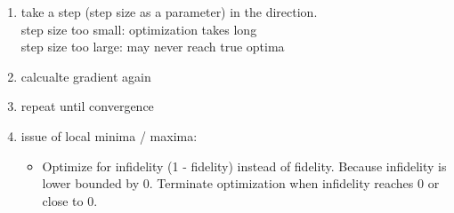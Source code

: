 \documentclass{article}
\begin{document}
\begin{enumerate}
\begin{enumerate}
        \end{enumerate}
    \item take a step (step size as a parameter) in the direction. \\
        step size too small: optimization takes long\\
        step size too large: may never reach true optima
    \item calcualte gradient again
    \item repeat until convergence
    \item issue of local minima / maxima: 
        \begin{itemize}
            \item Optimize for infidelity (1 - fidelity) instead of fidelity. 
                Because infidelity is lower bounded by 0. Terminate optimization when infidelity reaches 0 or close to 0. 
        \end{itemize}
\end{enumerate}

\end{document}
